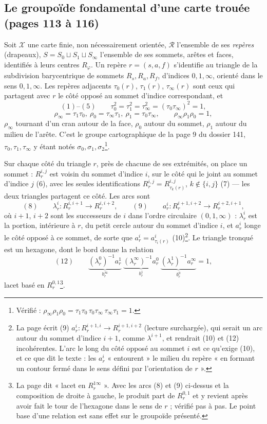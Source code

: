 \documentclass[11pt,a4paper]{article}
\begin{document}
\subsection*{Le groupoïde fondamental d'une carte trouée (pages 113 à 116)}

Soit $\mathcal{X}$ une carte finie, non nécessairement orientée, $\mathcal{R}$
l'ensemble de ses \emph{repères} (drapeaux), $S = S_0 \sqcup S_1 \sqcup
S_\infty$ l'ensemble de ses sommets, arêtes et faces, identifiés à leurs
centres $R_\varphi$. Un repère $r = (s, a, f)$ s'identifie au triangle de la
subdivision barycentrique de sommets $R_s, R_a, R_f$, d'indices $0, 1,
\infty$, orienté dans le sens $0, 1, \infty$. Les repères adjacents
$\tau_0(r)$, $\tau_1(r)$, $\tau_\infty(r)$ sont ceux qui partagent avec $r$ le
côté opposé au sommet d'indice correspondant, et
\[
(1)\text{–}(5)\qquad \tau_0^2 = \tau_1^2 = \tau_\infty^2 = (\tau_0\tau_\infty)^2 = 1,
\]
\[
\rho_\infty = \tau_1\tau_0,\ \rho_0 = \tau_\infty\tau_1,\ \rho_1 = \tau_0\tau_\infty, \qquad \rho_\infty\rho_1\rho_0 = 1 ,
\]
$\rho_\infty$ tournant d'un cran autour de la face, $\rho_0$ autour du sommet,
$\rho_1$ autour du milieu de l'arête. C'est le groupe cartographique de la page
9 du dossier 141, $\tau_0, \tau_1, \tau_\infty$ y étant notés $\sigma_0,
\sigma_1, \sigma_2$\footnote{Vérifié : $\rho_\infty\rho_1\rho_0 =
\tau_1\tau_0\,\tau_0\tau_\infty\,\tau_\infty\tau_1 = 1$.}.

Sur chaque côté du triangle $r$, près de chacune de ses extrémités, on place un
sommet : $R^{i,j}_r$ est voisin du sommet d'indice $i$, sur le côté qui le
joint au sommet d'indice $j$ (6), avec les seules identifications
$R^{i,j}_r = R^{i,j}_{\tau_k(r)}$, $k \notin \{i, j\}$ (7) — les deux
triangles partagent ce côté. Les arcs sont
\[
(8)\qquad \lambda^i_r : R^{i,i+1}_r \longrightarrow R^{i,i+2}_r, \qquad
(9)\qquad a^i_r : R^{i+1,i+2}_r \longrightarrow R^{i+2,i+1}_r ,
\]
où $i + 1$, $i + 2$ sont les successeurs de $i$ dans l'ordre circulaire $(0,
1, \infty)$ : $\lambda^i_r$ est la portion, intérieure à $r$, du petit cercle
autour du sommet d'indice $i$, et $a^i_r$ longe le côté opposé à ce sommet, de
sorte que $a^i_r = a^i_{\tau_i(r)}$ (10)\footnote{La page écrit (9) $a^i_r :
R^{i+1,i}_r \to R^{i+1,i+2}_r$ (lecture surchargée), qui serait un arc autour
du sommet d'indice $i + 1$, comme $\lambda^{i+1}$, et rendrait (10) et (12)
incohérentes. L'arc le long du côté opposé au sommet $i$ est ce qu'exige
(10), et ce que dit le texte : les $a^i_r$ « entourent » le milieu du repère
« en formant un contour fermé dans le sens défini par l'orientation de $r$ ».}.
Le triangle tronqué est un hexagone, dont le bord donne la relation
\[
(12)\qquad \underbrace{(\lambda^0_r)^{-1} a^1_r}_{b^\infty_r}\ \underbrace{(\lambda^\infty_r)^{-1} a^0_r}_{b^1_r}\ \underbrace{(\lambda^1_r)^{-1} a^\infty_r}_{b^0_r} = 1 ,
\]
lacet basé en $R^{0,1}_r$\footnote{La page dit « lacet en $R^{1\infty}_r$ ».
Avec les arcs (8) et (9) ci-dessus et la composition de droite à gauche, le
produit part de $R^{0,1}_r$ et y revient après avoir fait le tour de
l'hexagone dans le sens de $r$ ; vérifié pas à pas. Le point base d'une
relation est sans effet sur le groupoïde présenté.}.
\end{document}
